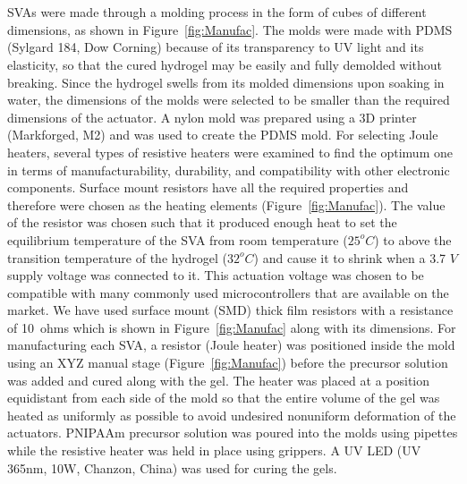 \section{}
SVAs were made through a molding process in the form of cubes of different dimensions, as shown in Figure~\ref{fig:Manufac}. The molds were made with PDMS (Sylgard 184, Dow Corning) because of its transparency to UV light and its elasticity, so that the cured hydrogel may be easily and fully demolded without breaking. Since the hydrogel swells from its molded dimensions upon soaking in water, the dimensions of the molds were selected to be smaller than the required dimensions of the actuator. A nylon mold was prepared using a 3D printer (Markforged, M2) and was used to create the PDMS mold. For selecting Joule heaters, several types of resistive heaters were examined to find the optimum one in terms of manufacturability, durability, and compatibility with other electronic components. Surface mount resistors have all the required properties and therefore were chosen as the heating elements (Figure~\ref{fig:Manufac}). The value of the resistor was chosen such that it produced enough heat to set the equilibrium temperature of the SVA from room temperature ($25^{o}C$) to above the transition temperature of the hydrogel ($32^{o}C$) and cause it to shrink when a 3.7 $V$ supply voltage was connected to it. This actuation voltage was chosen to be compatible with many commonly used microcontrollers that are available on the market. We have used surface mount 
(SMD) thick film resistors with a resistance of 10~ohms which is shown in Figure~\ref{fig:Manufac} along with its dimensions.  For manufacturing each SVA, a resistor (Joule heater) was positioned inside the mold using an XYZ manual stage (Figure~\ref{fig:Manufac}) before the precursor solution was added and cured along with the gel. The heater was placed at a position equidistant from each side of the mold so that the entire volume of the gel was heated as uniformly as possible to avoid undesired nonuniform deformation of the actuators. PNIPAAm precursor solution was poured into the molds using pipettes while the resistive heater was held in place using grippers. A UV LED (UV 365nm, 10W, Chanzon, China) was used for curing the gels. 


